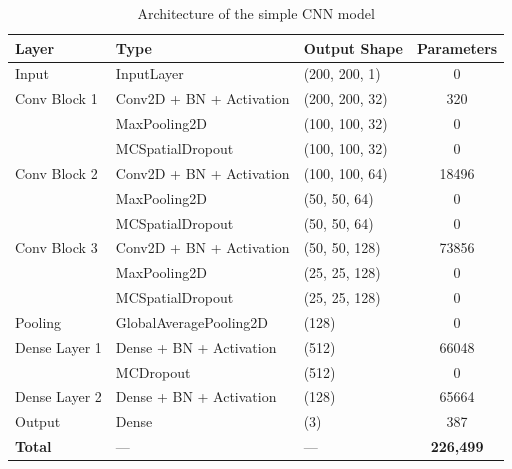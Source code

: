 \begin{table}[H]
\centering
\scriptsize
\label{tab:cnn_summary}
	\begin{tabular}{lllc}
		\toprule
		\textbf{Layer} & \textbf{Type} & \textbf{Output Shape} & \textbf{Parameters} \\
		\midrule
		Input             & InputLayer                    & (200, 200, 1)     & 0      \\
		\midrule
		Conv Block 1      & Conv2D + BN + Activation      & (200, 200, 32)    & 320 \\
                   & MaxPooling2D                 & (100, 100, 32)    & 0      \\
                   & MCSpatialDropout             & (100, 100, 32)    & 0      \\
		\midrule
		Conv Block 2      & Conv2D + BN + Activation      & (100, 100, 64)    & 18496\\
                   & MaxPooling2D                 & (50, 50, 64)      & 0      \\
                   & MCSpatialDropout             & (50, 50, 64)      & 0      \\
		\midrule
		Conv Block 3      & Conv2D + BN + Activation      & (50, 50, 128)     & 73856\\
                   & MaxPooling2D                 & (25, 25, 128)     & 0      \\
                   & MCSpatialDropout             & (25, 25, 128)     & 0      \\
		\midrule
		Pooling           & GlobalAveragePooling2D        & (128)             & 0      \\
		\midrule
		Dense Layer 1     & Dense + BN + Activation       & (512)             & 66048 \\
                   & MCDropout                    & (512)             & 0      \\
		Dense Layer 2     & Dense + BN + Activation       & (128)             & 65664 \\
		Output            & Dense                         & (3)               & 387    \\
		\midrule
    		\textbf{Total}    & —                 & —                 & \textbf{226,499} \\
    		\bottomrule	\end{tabular}
	\caption{Architecture of the simple CNN model}
\end{table}

